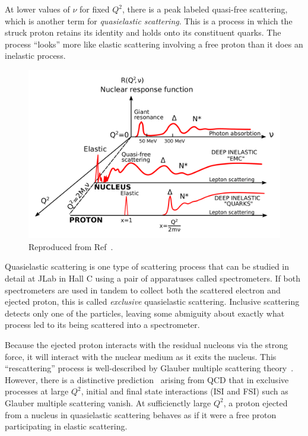 At lower values of $\nu$ for fixed $Q^2$, there is a peak labeled
quasi-free scattering, which is another term for \textit{quasielastic
scattering}.
This is a process in which the struck proton retains its identity and holds
onto its constituent quarks.
The process ``looks'' more like elastic scattering involving a free proton than
it does an inelastic process.

\begin{figure}[!h]
    \centering
    \includegraphics[width=1.0\textwidth]{chap1/nuclear_response_function_new.pdf}
    \caption{
             Reproduced from Ref~\cite{Frois_1985}.
            }
    \label{fig:nuclear_response_function}
\end{figure}

Quasielastic scattering is one type of scattering process that can be studied
in detail at JLab in Hall C using a pair of apparatuses called spectrometers.
If both spectrometers are used in tandem to collect both the scattered electron
and ejected proton, this is called \textit{exclusive} quasielastic scattering.
Inclusive scattering detects only one of the particles, leaving some abmiguity
about exactly what process led to its being scattered into a spectrometer.


Because the ejected proton interacts with the residual nucleons via the strong
force, it will interact with the nuclear medium as it exits the nucleus.
This ``rescattering'' process is well-described by Glauber multiple scattering
theory~\cite{Glauber_1959}.
However, there is a distinctive prediction~\cite{Mueller_1982,Brodsky_1982}
arising from QCD that in exclusive processes at large $Q^2$, initial and final
state interactions (ISI and FSI) such as Glauber multiple scattering vanish.
At sufficienctly large $Q^2$, a proton ejected from a nucleus in quasielastic
scattering behaves as if it were a free proton participating in elastic
scattering.
